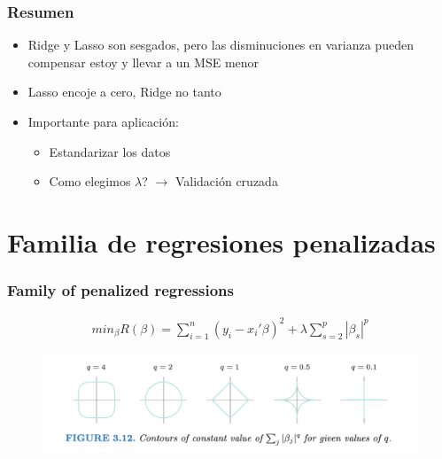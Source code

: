 \documentclass[
  shownotes,
  xcolor={svgnames},
  hyperref={colorlinks,citecolor=DarkBlue,linkcolor=andesred,urlcolor=DarkBlue}
  , aspectratio=169]{beamer}
\begin{document}
\begin{frame}[fragile]
\frametitle{Resumen}

\begin{itemize}
 \item Ridge y Lasso  son sesgados, pero las disminuciones en varianza pueden compensar estoy y llevar a un MSE menor
 \medskip

 \item Lasso encoje a cero, Ridge no tanto
 \medskip
 \item Importante para aplicación:
\begin{itemize}
  \medskip
 \item Estandarizar los datos 
 \medskip
 \item Como elegimos $\lambda$? \pause $\rightarrow$ Validación cruzada
\end{itemize}
\end{itemize}




 \end{frame}



\section{Familia de regresiones penalizadas}
\begin{frame}[fragile]
\frametitle{Family of penalized regressions}

\footnotesize
\begin{align}
min_{\beta} R(\beta) = \sum_{i=1}^n (y_i-x_i'\beta)^2 + \lambda \sum_{s=2}^p |\beta_s|^p
\end{align}

 \begin{figure}[H] \centering
            \captionsetup{justification=centering}
              \includegraphics[scale=0.6]{figures/penalties.png}
 \end{figure}


\end{frame}
\end{document}
